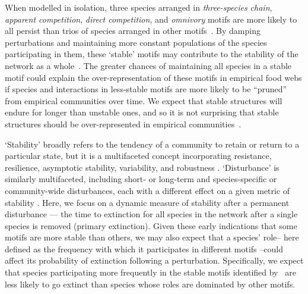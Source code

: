 \documentclass[12pt]{article}
\begin{document}
\begin{spacing}{1.0}
	When modelled in isolation, three species arranged in \emph{three-species chain}, \emph{apparent competition}, \emph{direct competition}, and \emph{omnivory} motifs are more likely to all persist than trios of species arranged in other motifs~\citep{Borrelli2015a}.
	By damping perturbations and maintaining more constant populations of the species participating in them, these `stable' motifs may contribute to the stability of the network as a whole~\citep{Borrelli2015a}. 
    The greater chances of maintaining all species in a stable motif could explain the over-representation of these motifs in empirical food webs if species and interactions in less-stable motifs are more likely to be ``pruned'' from empirical communities over time. 
    We expect that stable structures will endure for longer than unstable ones, and so it is not surprising that stable structures should be over-represented in empirical communities~\citep{Borrelli2015}.


    `Stability' broadly refers to the tendency of a community to retain or return to a particular state, but it is a multifaceted concept incorporating resistance, resilience, asymptotic stability, variability, and robustness \citep{Donohue2013}.
    `Disturbance' is similarly multifaceted, including short- or long-term and species-specific or community-wide disturbances, each with a different effect on a given metric of stability \citep{Donohue2013,Radchuck2019}.
    Here, we focus on a dynamic measure of stability after a permanent disturbance --- the time to extinction for all species in the network after a single species is removed (primary extinction).
    Given these early indications that some motifs are more stable than others, we may also expect that a species' role-- here defined as the frequency with which it participates in different motifs --could affect its probability of extinction following a perturbation.
	Specifically, we expect that species participating more frequently in the stable motifs identified by~\citet{Borrelli2015a} are less likely to go extinct than species whose roles are dominated by other motifs.
	 
	
	

\end{spacing}
\end{document}
